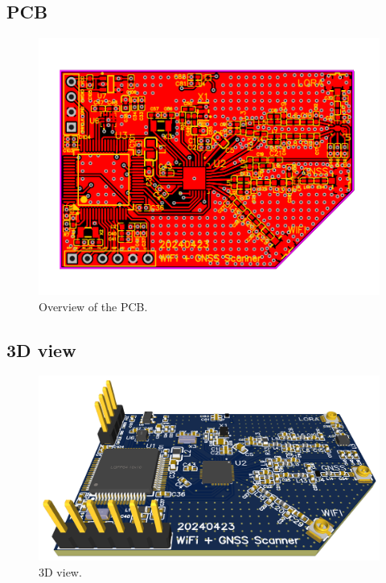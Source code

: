\begin{appendices}
\begin{landscape}
    \subsection{PCB} \label{app:PCB}
    \begin{figure}[H]  
        \centering
        \includegraphics[width=1\textwidth]{figures/PCB_v3.png}
        \caption{Overview of the PCB.}
    \end{figure}
\end{landscape}

\begin{landscape}
    \subsection{3D view} \label{app:3DView}
    \begin{figure}[H]  
        \centering
        \includegraphics[width=1.38\textwidth]{figures/PCB_v3_3D.png}
        \caption{3D view.}
    \end{figure}
\end{landscape}

\end{appendices}